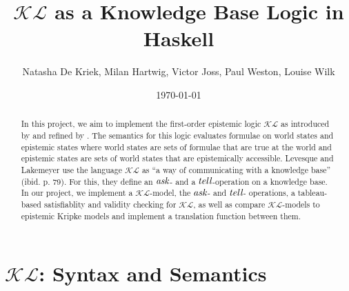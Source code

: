 \documentclass[12pt,a4paper]{article}
\title{$\mathcal{KL}$ as a Knowledge Base Logic in Haskell}
\author{Natasha De Kriek, Milan Hartwig, Victor Joss, Paul Weston, Louise Wilk}
\date{\today}
\begin{document}
\maketitle

\begin{abstract}
In this project, we aim to implement the first-order epistemic logic $\mathcal{KL}$ as introduced by \textcite{levesque1981} and refined by \textcite{Lokb}. 
The semantics for this logic evaluates formulae on world states and epistemic states where world states are sets of formulae that are true at the world and epistemic states are sets of world states that are epistemically accessible. Levesque and Lakemeyer use the language $\mathcal{KL}$ as ``a way of communicating with a knowledge base'' (ibid. p. 79). For this, they define an $\emph{ask}$- and a $\emph{tell}$-operation on a knowledge base. In our project, we implement a  $\mathcal{KL}$-model, the $\emph{ask}$- and $\emph{tell}$- operations, a tableau-based satisfiablity and validity checking for  $\mathcal{KL}$, as well as compare  $\mathcal{KL}$-models to epistemic Kripke models and implement a translation function between them.
\end{abstract}


\tableofcontents

\clearpage



\section{\texorpdfstring{$\mathcal{KL}$}{KL}: Syntax and Semantics}\label{sec:KLmodel}





















\printbibliography
\end{document}
